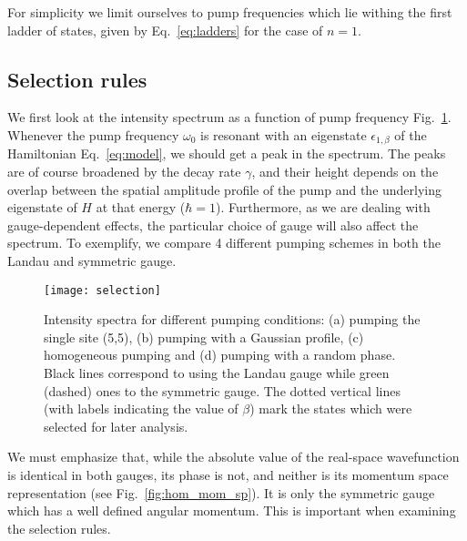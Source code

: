 \documentclass[twocolumn, 10pt, aps, superscriptaddress, floatfix, showpacs, pra, citeautoscript]{revtex4-1}
\newcommand{\co}[2]{#2}
\renewcommand{\paragraph}{\co}
\begin{document}
For simplicity we limit ourselves to pump frequencies which lie
withing the first ladder of states, given by Eq.~\eqref{eq:ladders}
for the case of $n = 1$.


\subsection{Selection rules}
\label{sec:selection}

\paragraph{The overlap between the pump state and the eigenstate determines the intensity.}
We first look at the intensity spectrum as a function of pump
frequency Fig.~\ref{fig:pumping_schemes}.  Whenever the pump frequency
$\omega_0$ is resonant with an eigenstate $\epsilon_{1,\beta}$ of the
Hamiltonian Eq.~\eqref{eq:model}, we should get a peak in the
spectrum. The peaks are of course broadened by the decay rate
$\gamma$, and their height depends on the overlap between the spatial
amplitude profile of the pump and the underlying eigenstate of $H$ at
that energy ($\hbar = 1$). Furthermore, as we are dealing with
gauge-dependent effects, the particular choice of gauge will also
affect the spectrum. To exemplify, we compare 4 different pumping
schemes in both the Landau and symmetric gauge.
%
\begin{figure}[htb]\centering
  \texttt{[image: selection]}
  \caption{Intensity spectra for different pumping conditions: (a)
    pumping the single site (5,5), (b) pumping with a Gaussian
    profile, (c) homogeneous pumping and (d) pumping with a random
    phase. Black lines correspond to using the Landau gauge while
    green (dashed) ones to the symmetric gauge. The dotted vertical
    lines (with labels indicating the value of $\beta$)
    mark the states which were selected for later analysis.}
  \label{fig:pumping_schemes}
\end{figure}

We must emphasize that, while the absolute value of the real-space
wavefunction is identical in both gauges, its phase is not, and
neither is its momentum space representation (see
Fig.~\ref{fig:hom_mom_sp}). It is only the symmetric gauge which has a
well defined angular momentum. This is important when examining the
selection rules.
\end{document}
